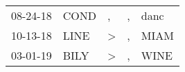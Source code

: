 \begin{supertabular}{p{0.07\textwidth}p{0.06\textwidth}p{0.02\textwidth}p{0.02\textwidth}p{0.06\textwidth}}
 08-24-18\textsuperscript{} &  COND\textsuperscript{} &             , &  , &  danc\textsuperscript{} \\
 10-13-18\textsuperscript{} &  LINE\textsuperscript{} &  \textgreater &  , &  MIAM\textsuperscript{} \\
 03-01-19\textsuperscript{} &  BILY\textsuperscript{} &  \textgreater &  , &  WINE\textsuperscript{} \\
\end{supertabular}
